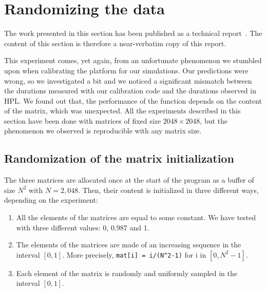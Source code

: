     \section{Randomizing the data}%
    \label{sec:randomizing_data}
        The work presented in this section has been published as a technical report~\cite{cornebize:bitflips}. The
        content of this section is therefore a near-verbatim copy of this report.

        This experiment comes, yet again, from an unfortunate phenomenon we stumbled upon when calibrating the platform
        for our simulations. Our predictions were wrong, so we investigated a bit and we noticed a significant mismatch
        between the durations measured with our calibration code and the durations observed in HPL. We found out that,
        the performance of the \dgemm function depends on the content of the matrix, which was unexpected. All the
        experiments described in this section have been done with matrices of fixed size \(2048\times2048\), but the
        phenomenon we observed is reproducible with any matrix size.

        \subsection{Randomization of the matrix initialization}
        \label{sub:randomization_matrix_initialization}
            The three matrices are allocated once at the start of the program as a buffer of size \(N^2\) with
            \(N=2,048\). Then, their content is initialized in three different ways, depending on the experiment:
            \begin{enumerate}
                \item All the elements of the matrices are equal to some constant. We have tested with three different
                    values: 0, 0.987 and 1.
                \item The elements of the matrices are made of an increasing sequence in the interval \([0, 1]\). More
                    precisely, \texttt{mat[i] = i/(N\textasciicircum{}2-1)} for i in \([0, N^2-1]\).
                \item Each element of the matrix is randomly and uniformly sampled in the interval \([0, 1]\).
            \end{enumerate}

